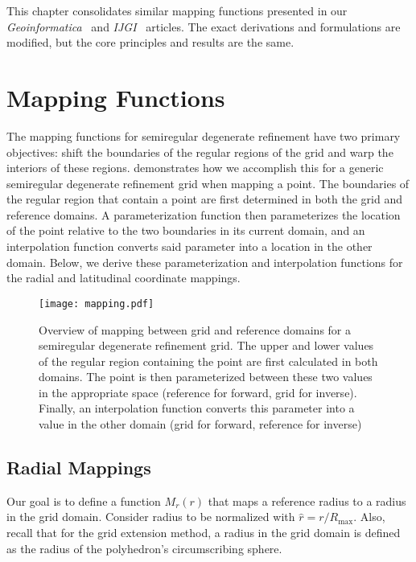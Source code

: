 This chapter consolidates similar mapping functions presented in our \textit{Geoinformatica}~\cite{ulmer2020toward} and \textit{IJGI}~\cite{ulmer2020general} articles.
The exact derivations and formulations are modified, but the core principles and results are the same.


\section{Mapping Functions} \label{chap:6:functions}
The mapping functions for semiregular degenerate refinement have two primary objectives: shift the boundaries of the regular regions of the grid and warp the interiors of these regions.
 demonstrates how we accomplish this for a generic semiregular degenerate refinement grid when mapping a point.
The boundaries of the regular region that contain a point are first determined in both the grid and reference domains.
A parameterization function then parameterizes the location of the point relative to the two boundaries in its current domain, and an interpolation function converts said parameter into a location in the other domain.
Below, we derive these parameterization and interpolation functions for the radial and latitudinal coordinate mappings.


\begin{figure}[ht!]
	\centering
	\texttt{[image: mapping.pdf]}
	\caption[Overview of mapping for semiregular degenerate refinement grids]{
		Overview of mapping between grid and reference domains for a semiregular degenerate refinement grid.
		The upper and lower values of the regular region containing the point are first calculated in both domains.
		The point is then parameterized between these two values in the appropriate space (reference for forward, grid for inverse).
		Finally, an interpolation function converts this parameter into a value in the other domain (grid for forward, reference for inverse)
	}
	\label{fig:mapping}
\end{figure}


\subsection{Radial Mappings} \label{chap:6:radial}
Our goal is to define a function $M_r(r)$ that maps a reference radius to a radius in the grid domain.
Consider radius to be normalized with $\hat{r} = r / R_\mathrm{max}$.
Also, recall that for the grid extension method, a radius in the grid domain is defined as the radius of the polyhedron's circumscribing sphere.


